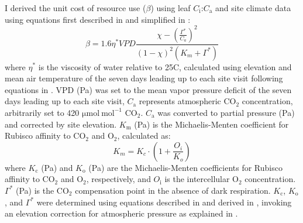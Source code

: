 I derived the unit cost of resource use ($\beta$) using leaf $C_\mathrm{i}$:$C_\mathrm{a}$ and site climate data using equations first described in  and simplified in :
\begin{equation}
    \label{eq_4.5}
    \beta = 1.6\eta^{*} VPD \frac{\chi - (\frac{\Gamma^*}{C_{a}})^{2}}{(1 - \chi)^{2}(K_{m} + \Gamma^{*})}
\end{equation}
\noindent where $\eta^{*}$ is the viscosity of water relative to 25\textdegree{}C, calculated using elevation and mean air temperature of the seven days leading up to each site visit following equations in . VPD (Pa) was set to the mean vapor pressure deficit of the seven days leading up to each site visit, $C_\mathrm{a}$ represents atmospheric CO$_2$ concentration, arbitrarily set to 420 $\mathrm{\mu mol\ mol^{-1}}$ CO$_2$. $C_\mathrm{a}$ was converted to partial pressure (Pa) and corrected by site elevation. $K_\mathrm{m}$ (Pa) is the Michaelis-Menten coefficient for Rubisco affinity to CO$_2$ and O$_2$, calculated as:
\begin{equation} \label{eq_4.6}
    K_{m} = K_{c} \cdot \left ( 1 + \frac{O_i}{K_o} \right )
\end{equation}
\noindent where $K_\mathrm{c}$ (Pa) and $K_\mathrm{o}$ (Pa) are the Michaelis-Menten coefficients for Rubisco affinity to CO$_2$ and O$_2$, respectively, and $O_\mathrm{i}$  is the intercellular O$_2$ concentration. $\Gamma^{*}$ (Pa) is the CO$_2$ compensation point in the absence of dark respiration. $K_\mathrm{c}$, $K_\mathrm{o}$, and $\Gamma^{*}$ were determined using equations described in  and derived in , invoking an elevation correction for atmospheric pressure as explained in .
\clearpage

